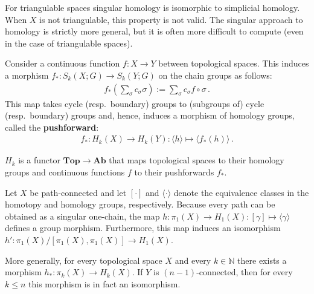     \begin{property}
        For triangulable spaces singular homology is isomorphic to simplicial homology. When $X$ is not triangulable, this property is not valid. The singular approach to homology is strictly more general, but it is often more difficult to compute (even in the case of triangulable spaces).
    \end{property}

    \begin{property}\label{topology:pushforward}
        Consider a continuous function $f:X\rightarrow Y$ between topological spaces. This induces a morphism $f_*:S_k(X;G)\rightarrow S_k(Y;G)$ on the chain groups as follows:
        \begin{gather}
            f_*\left(\sum_\sigma c_\sigma\sigma\right) := \sum_\sigma c_\sigma f\circ\sigma\,.
        \end{gather}
        This map takes cycle (resp.~boundary) groups to (subgroups of) cycle (resp.~boundary) groups and, hence, induces a morphism of homology groups, called the \textbf{pushforward}:
        \begin{gather}
            f_\ast:H_k(X)\rightarrow H_k(Y):\langle h \rangle\mapsto\langle f_*(h)\rangle\,.
        \end{gather}
    \end{property}
    \begin{result}
        $H_k$ is a functor $\mathbf{Top}\rightarrow\mathbf{Ab}$ that maps topological spaces to their homology groups and continuous functions $f$ to their pushforwards $f_\ast$.
    \end{result}

    \begin{theorem}[Hurewicz]
        Let $X$ be path-connected and let $[\cdot]$ and $\langle\cdot\rangle$ denote the equivalence classes in the homotopy and homology groups, respectively. Because every path can be obtained as a singular one-chain, the map $h:\pi_1(X)\rightarrow H_1(X):[\gamma]\mapsto\langle\gamma\rangle$ defines a group morphism. Furthermore, this map induces an isomorphism $h':\pi_1(X)/[\pi_1(X),\pi_1(X)]\rightarrow H_1(X)$.

        More generally, for every topological space $X$ and every $k\in\mathbb{N}$ there exists a morphism $h_*:\pi_k(X)\rightarrow H_k(X)$. If $Y$ is $(n-1)$-connected, then for every $k\leq n$ this morphism is in fact an isomorphism.
    \end{theorem}

